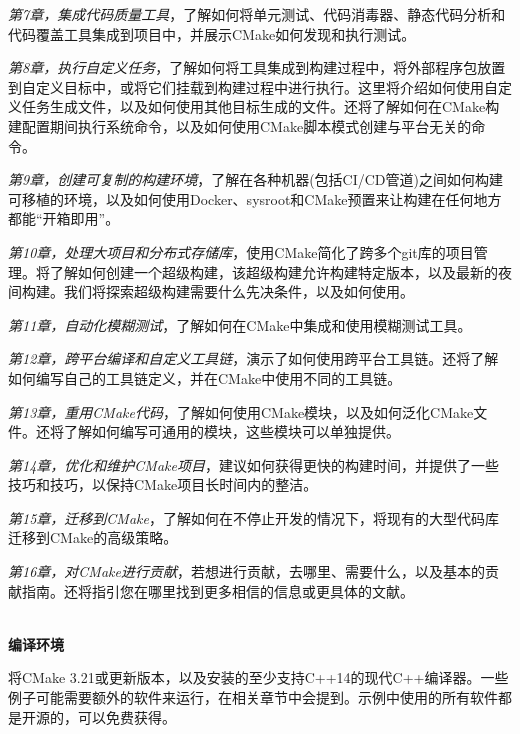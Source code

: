 \textit{第7章，集成代码质量工具}，了解如何将单元测试、代码消毒器、静态代码分析和代码覆盖工具集成到项目中，并展示CMake如何发现和执行测试。

\textit{第8章，执行自定义任务}，了解如何将工具集成到构建过程中，将外部程序包放置到自定义目标中，或将它们挂载到构建过程中进行执行。这里将介绍如何使用自定义任务生成文件，以及如何使用其他目标生成的文件。还将了解如何在CMake构建配置期间执行系统命令，以及如何使用CMake脚本模式创建与平台无关的命令。

\textit{第9章，创建可复制的构建环境}，了解在各种机器(包括CI/CD管道)之间如何构建可移植的环境，以及如何使用Docker、sysroot和CMake预置来让构建在任何地方都能“开箱即用”。

\textit{第10章，处理大项目和分布式存储库}，使用CMake简化了跨多个git库的项目管理。将了解如何创建一个超级构建，该超级构建允许构建特定版本，以及最新的夜间构建。我们将探索超级构建需要什么先决条件，以及如何使用。

\textit{第11章，自动化模糊测试}，了解如何在CMake中集成和使用模糊测试工具。

\textit{第12章，跨平台编译和自定义工具链}，演示了如何使用跨平台工具链。还将了解如何编写自己的工具链定义，并在CMake中使用不同的工具链。

\textit{第13章，重用CMake代码}，了解如何使用CMake模块，以及如何泛化CMake文件。还将了解如何编写可通用的模块，这些模块可以单独提供。

\textit{第14章，优化和维护CMake项目}，建议如何获得更快的构建时间，并提供了一些技巧和技巧，以保持CMake项目长时间内的整洁。 

\textit{第15章，迁移到CMake}，了解如何在不停止开发的情况下，将现有的大型代码库迁移到CMake的高级策略。

\textit{第16章，对CMake进行贡献}，若想进行贡献，去哪里、需要什么，以及基本的贡献指南。还将指引您在哪里找到更多相信的信息或更具体的文献。

\hspace*{\fill} \\ %
\textbf{编译环境}

将CMake 3.21或更新版本，以及安装的至少支持C++14的现代C++编译器。一些例子可能需要额外的软件来运行，在相关章节中会提到。示例中使用的所有软件都是开源的，可以免费获得。

